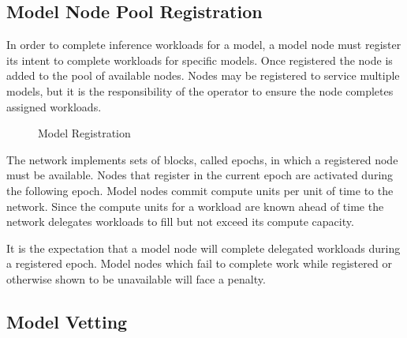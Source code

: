 \documentclass[conference]{IEEEtran}
\begin{document}
\subsection{Model Node Pool Registration}

In order to complete inference workloads for a model, a model node must register its intent to complete workloads for specific models. Once registered the node is added to the pool of available nodes. Nodes may be registered to service multiple models, but it is the responsibility of the operator to ensure the node completes assigned workloads.

\begin{figure}[!ht]
    \centering
{}
    \caption{Model Registration}
    \label{fig:Fig 3}
\end{figure}

The network implements sets of blocks, called epochs, in which a registered node must be available. Nodes that register in the current epoch are activated during the following epoch. Model nodes commit compute units per unit of time to the network. Since the compute units for a workload are known ahead of time the network delegates workloads to fill but not exceed its compute capacity.

It is the expectation that a model node will complete delegated workloads during a registered epoch. Model nodes which fail to complete work while registered or otherwise shown to be unavailable will face a penalty.

\subsection{Model Vetting}
\end{document}
